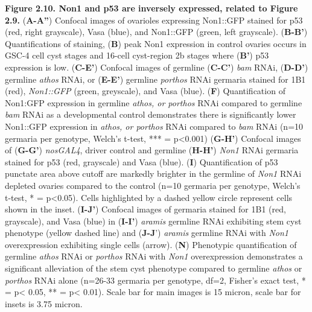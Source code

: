\documentclass[12pt,oneside]{reedthesis}
\begin{document}
\textbf{Figure 2.10. Non1 and p53 are inversely expressed, related
to Figure 2.9.} (\textbf{A-A''}) Confocal images of ovarioles expressing
Non1::GFP stained for p53 (red, right grayscale), Vasa (blue), and
Non1::GFP (green, left grayscale). (\textbf{B-B'}) Quantifications of
staining, (\textbf{B}) peak Non1 expression in control ovaries occurs in
GSC-4 cell cyst stages and 16-cell cyst-region 2b stages where (\textbf{B'})
p53 expression is low. (\textbf{C-E'}) Confocal images of germline (\textbf{C-C'})
\emph{bam} RNAi, (\textbf{D-D'}) germline \emph{athos} RNAi, or (\textbf{E-E'}) germline
\emph{porthos} RNAi germaria stained for 1B1 (red), \emph{Non1::GFP} (green,
greyscale), and Vasa (blue). (\textbf{F}) Quantification of Non1:GFP
expression in germline \emph{athos, or porthos} RNAi compared to germline
\emph{bam} RNAi as a developmental control demonstrates there is
significantly lower Non1::GFP expression in \emph{athos, or porthos} RNAi
compared to \emph{bam} RNAi (n=10 germaria per genotype, Welch's t-test,
*** = p\textless0.001) (\textbf{G-H'}) Confocal images of (\textbf{G-G'}) \emph{nosGAL4},
driver control and germline (\textbf{H-H'}) \emph{Non1} RNAi germaria stained for
p53 (red, grayscale) and Vasa (blue). (\textbf{I}) Quantification of p53
punctate area above cutoff are markedly brighter in the germline of
\emph{Non1} RNAi depleted ovaries compared to the control (n=10 germaria per
genotype, Welch's t-test, * = p\textless0.05). Cells highlighted by a dashed
yellow circle represent cells shown in the inset. (\textbf{I-J'}) Confocal
images of germaria stained for 1B1 (red, grayscale), and Vasa (blue) in
(\textbf{I-I'}) \emph{aramis} germline RNAi exhibiting stem cyst phenotype (yellow
dashed line) and (\textbf{J-J}') \emph{aramis} germline RNAi with \emph{Non1}
overexpression exhibiting single cells (arrow). (\textbf{N}) Phenotypic
quantification of germline \emph{athos} RNAi or \emph{porthos} RNAi with \emph{Non1}
overexpression demonstrates a significant alleviation of the stem cyst
phenotype compared to germline \emph{athos} or \emph{porthos} RNAi alone (n=26-33
germaria per genotype, df=2, Fisher's exact test, * = p\textless{} 0.05, ** =
p\textless{} 0.01). Scale bar for main images is 15 micron, scale bar for insets
is 3.75 micron.

\textbf{\hfill\break
}
\end{document}
